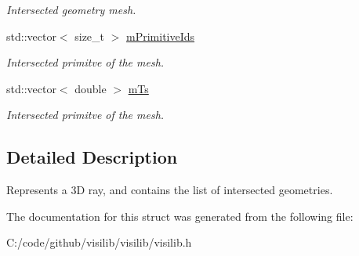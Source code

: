 \begin{DoxyCompactItemize}
\begin{DoxyCompactList}\small\item\em Intersected geometry mesh. \end{DoxyCompactList}\item 
\mbox{\label{structvisilib_1_1_visibility_ray_a544abf65e84c6ab85ba8b919b773b768}} 
std\+::vector$<$ size\+\_\+t $>$ \mbox{\hyperlink{structvisilib_1_1_visibility_ray_a544abf65e84c6ab85ba8b919b773b768}{m\+Primitive\+Ids}}
\begin{DoxyCompactList}\small\item\em Intersected primitve of the mesh. \end{DoxyCompactList}\item 
\mbox{\label{structvisilib_1_1_visibility_ray_ac2a55af977beb87b9c1ce11667c12850}} 
std\+::vector$<$ double $>$ \mbox{\hyperlink{structvisilib_1_1_visibility_ray_ac2a55af977beb87b9c1ce11667c12850}{m\+Ts}}
\begin{DoxyCompactList}\small\item\em Intersected primitve of the mesh. \end{DoxyCompactList}\end{DoxyCompactItemize}


\subsection{Detailed Description}
Represents a 3D ray, and contains the list of intersected geometries. 

The documentation for this struct was generated from the following file\+:\begin{DoxyCompactItemize}
\item 
C\+:/code/github/visilib/visilib/visilib.\+h\end{DoxyCompactItemize}
